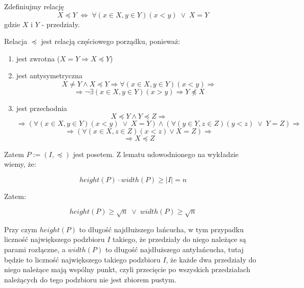 \documentclass{mwart}
\begin{document}
\begin{mdframed}
    Zdefiniujmy relację
    \[ X \preceq Y \; \Leftrightarrow \; \forall(x\in X,y\in Y)(x<y) \; \vee \; X = Y \]
    gdzie $X$ i $Y$ - przedziały.

    Relacja $\preceq$ jest relacją częściowego porządku, ponieważ:
    \begin{enumerate}
        \item jest zwrotna ($X = Y \Rightarrow X \preceq Y$)
        \item jest antysymetryczna
        \[
        X \neq Y \wedge X \preceq Y \Rightarrow \forall(x\in X,y\in Y)(x<y) \Rightarrow 
        \]
        \[
        \Rightarrow \neg \exists(x \in X, y \in Y)(x > y) \Rightarrow Y \npreceq X
        \]
        \item jest przechodnia\
        \[
        X \preceq Y \wedge Y \preceq Z \Rightarrow 
        \]\[
        \Rightarrow (\forall(x\in X,y\in Y)(x<y) \; \vee \; X = Y) \wedge 
        (\forall(y\in Y,z\in Z)(y<z) \; \vee \; Y = Z) \Rightarrow
        \]\[
        \Rightarrow (\forall(x\in X, z \in Z)(x<z) \vee X = Z) \Rightarrow 
        \]\[
        \Rightarrow X \preceq Z
        \]
    \end{enumerate}
    Zatem $P := (I, \preceq)$ jest posetem. Z lematu udowodnionego na wykładzie wiemy, że: 

    \[height(P) \cdot width(P) \geq |I| = n\]

    Zatem:

    \[
    height(P) \geq \sqrt{n} \;\vee \;width(P) \geq \sqrt{n}
    \]

    Przy czym $height(P)$ to długość najdłuższego łańcucha, w tym przypadku liczność największego podzbioru $I$ takiego, 
    że przedziały do niego należące są parami rozłączne, a $width(P)$ to długość najdłuższego antyłańcucha, 
    tutaj będzie to liczność największego takiego podzbioru $I$, że każde dwa przedziały do niego należące mają wspólny punkt, 
    czyli przecięcie po wszyskich przedziałach należących do tego podzbioru nie jest zbiorem pustym.

\end{mdframed}
\begin{mdframed}

\end{mdframed}
\end{document}
